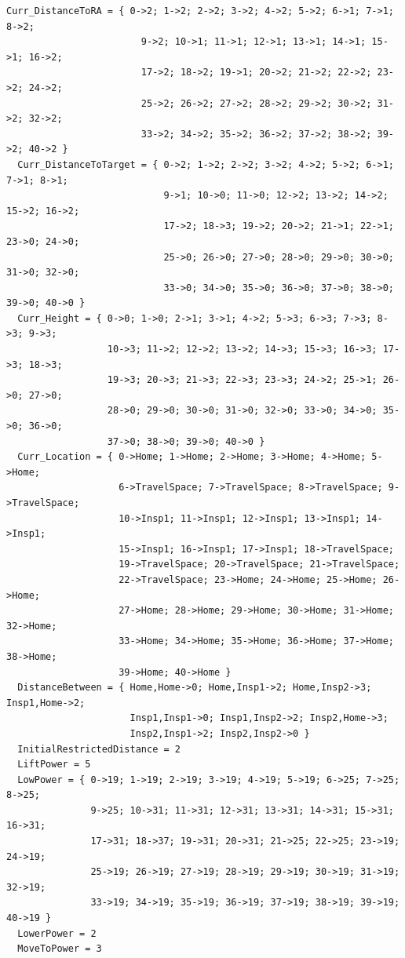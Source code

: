 \documentclass[12pt]{extarticle}
\begin{document}
\begin{lstlisting}[basicstyle=\tiny]
  Curr_DistanceToRA = { 0->2; 1->2; 2->2; 3->2; 4->2; 5->2; 6->1; 7->1; 8->2;
                        9->2; 10->1; 11->1; 12->1; 13->1; 14->1; 15->1; 16->2;
                        17->2; 18->2; 19->1; 20->2; 21->2; 22->2; 23->2; 24->2;
                        25->2; 26->2; 27->2; 28->2; 29->2; 30->2; 31->2; 32->2;
                        33->2; 34->2; 35->2; 36->2; 37->2; 38->2; 39->2; 40->2 }
  Curr_DistanceToTarget = { 0->2; 1->2; 2->2; 3->2; 4->2; 5->2; 6->1; 7->1; 8->1;
                            9->1; 10->0; 11->0; 12->2; 13->2; 14->2; 15->2; 16->2;
                            17->2; 18->3; 19->2; 20->2; 21->1; 22->1; 23->0; 24->0;
                            25->0; 26->0; 27->0; 28->0; 29->0; 30->0; 31->0; 32->0;
                            33->0; 34->0; 35->0; 36->0; 37->0; 38->0; 39->0; 40->0 }
  Curr_Height = { 0->0; 1->0; 2->1; 3->1; 4->2; 5->3; 6->3; 7->3; 8->3; 9->3;
                  10->3; 11->2; 12->2; 13->2; 14->3; 15->3; 16->3; 17->3; 18->3;
                  19->3; 20->3; 21->3; 22->3; 23->3; 24->2; 25->1; 26->0; 27->0;
                  28->0; 29->0; 30->0; 31->0; 32->0; 33->0; 34->0; 35->0; 36->0;
                  37->0; 38->0; 39->0; 40->0 }
  Curr_Location = { 0->Home; 1->Home; 2->Home; 3->Home; 4->Home; 5->Home;
                    6->TravelSpace; 7->TravelSpace; 8->TravelSpace; 9->TravelSpace;
                    10->Insp1; 11->Insp1; 12->Insp1; 13->Insp1; 14->Insp1;
                    15->Insp1; 16->Insp1; 17->Insp1; 18->TravelSpace;
                    19->TravelSpace; 20->TravelSpace; 21->TravelSpace;
                    22->TravelSpace; 23->Home; 24->Home; 25->Home; 26->Home;
                    27->Home; 28->Home; 29->Home; 30->Home; 31->Home; 32->Home;
                    33->Home; 34->Home; 35->Home; 36->Home; 37->Home; 38->Home;
                    39->Home; 40->Home }
  DistanceBetween = { Home,Home->0; Home,Insp1->2; Home,Insp2->3; Insp1,Home->2;
                      Insp1,Insp1->0; Insp1,Insp2->2; Insp2,Home->3;
                      Insp2,Insp1->2; Insp2,Insp2->0 }
  InitialRestrictedDistance = 2
  LiftPower = 5
  LowPower = { 0->19; 1->19; 2->19; 3->19; 4->19; 5->19; 6->25; 7->25; 8->25; 
               9->25; 10->31; 11->31; 12->31; 13->31; 14->31; 15->31; 16->31;
               17->31; 18->37; 19->31; 20->31; 21->25; 22->25; 23->19; 24->19;
               25->19; 26->19; 27->19; 28->19; 29->19; 30->19; 31->19; 32->19;
               33->19; 34->19; 35->19; 36->19; 37->19; 38->19; 39->19; 40->19 }
  LowerPower = 2
  MoveToPower = 3
  

\end{lstlisting}
\end{document}
